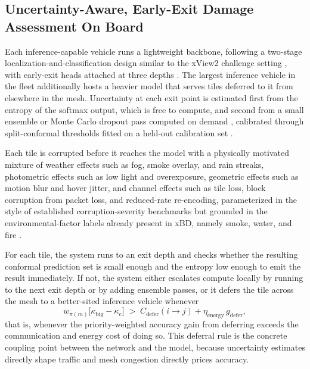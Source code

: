 \documentclass[drones,article,submit,moreauthors]{Definitions/mdpi}
\begin{document}
\subsection{Uncertainty-Aware, Early-Exit Damage Assessment On Board}

Each inference-capable vehicle runs a lightweight backbone, following a two-stage localization-and-classification design similar to the xView2 challenge setting \cite{gupta2019xbd,weber2020building}, with early-exit heads attached at three depths \cite{teerapittayanon2016branchynet}. The largest inference vehicle in the fleet additionally hosts a heavier model that serves tiles deferred to it from elsewhere in the mesh. Uncertainty at each exit point is estimated first from the entropy of the softmax output, which is free to compute, and second from a small ensemble or Monte Carlo dropout pass computed on demand \cite{gal2016dropout,lakshminarayanan2017simple}, calibrated through split-conformal thresholds fitted on a held-out calibration set \cite{angelopoulos2021gentle}.

Each tile is corrupted before it reaches the model with a physically motivated mixture of weather effects such as fog, smoke overlay, and rain streaks, photometric effects such as low light and overexposure, geometric effects such as motion blur and hover jitter, and channel effects such as tile loss, block corruption from packet loss, and reduced-rate re-encoding, parameterized in the style of established corruption-severity benchmarks \cite{hendrycks2019benchmarking} but grounded in the environmental-factor labels already present in xBD, namely smoke, water, and fire \cite{gupta2019xbd}.

For each tile, the system runs to an exit depth and checks whether the resulting conformal prediction set is small enough and the entropy low enough to emit the result immediately. If not, the system either escalates compute locally by running to the next exit depth or by adding ensemble passes, or it defers the tile across the mesh to a better-sited inference vehicle whenever
\begin{equation}
w_{\pi(m)} \big[\kappa_{\mathrm{big}} - \kappa_e\big] \;>\; C_{\mathrm{defer}}(i \to j) + \eta_{\mathrm{energy}}\, g_{\mathrm{defer}},
\end{equation}
that is, whenever the priority-weighted accuracy gain from deferring exceeds the communication and energy cost of doing so. This deferral rule is the concrete coupling point between the network and the model, because uncertainty estimates directly shape traffic and mesh congestion directly prices accuracy.
\end{document}
